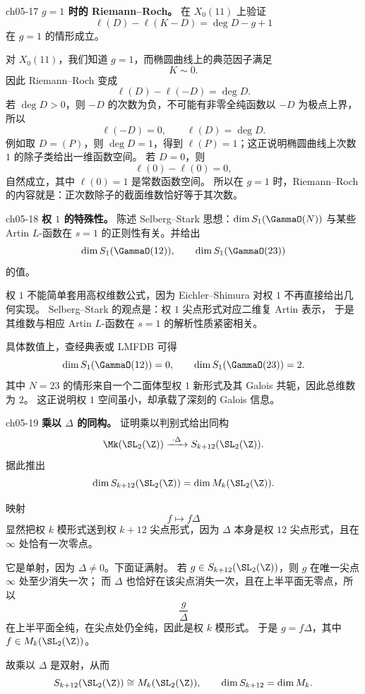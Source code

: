 \begin{problem}{ch05-17}
\textbf{$g=1$ 时的 Riemann--Roch。}
在 $X_0(11)$ 上验证
\[
\ell(D)-\ell(K-D)=\deg D-g+1
\]
在 $g=1$ 的情形成立。
\end{problem}
\begin{solution}
对 $X_0(11)$，我们知道 $g=1$，而椭圆曲线上的典范因子满足
\[
K\sim 0.
\]
因此 Riemann--Roch 变成
\[
\ell(D)-\ell(-D)=\deg D.
\]
若 $\deg D>0$，则 $-D$ 的次数为负，不可能有非零全纯函数以 $-D$ 为极点上界，所以
\[
\ell(-D)=0,
\qquad \ell(D)=\deg D.
\]
例如取 $D=(P)$，则 $\deg D=1$，得到 $\ell(P)=1$；这正说明椭圆曲线上次数 $1$ 的除子类给出一维函数空间。
若 $D=0$，则
\[
\ell(0)-\ell(0)=0,
\]
自然成立，其中 $\ell(0)=1$ 是常数函数空间。
所以在 $g=1$ 时，Riemann--Roch 的内容就是：正次数除子的截面维数恰好等于其次数。
\end{solution}

\begin{problem}{ch05-18}
\textbf{权 $1$ 的特殊性。}
陈述 Selberg--Stark 思想：$\dim S_1(\GammaO(N))$ 与某些 Artin $L$-函数在 $s=1$ 的正则性有关。并给出
\[
\dim S_1(\GammaO(12)),\qquad \dim S_1(\GammaO(23))
\]
的值。
\end{problem}
\begin{solution}
权 $1$ 不能简单套用高权维数公式，因为 Eichler--Shimura 对权 $1$ 不再直接给出几何实现。
Selberg--Stark 的观点是：权 $1$ 尖点形式对应二维复 Artin 表示，
于是其维数与相应 Artin $L$-函数在 $s=1$ 的解析性质紧密相关。

具体数值上，查经典表或 LMFDB 可得
\[
\dim S_1(\GammaO(12))=0,
\qquad
\dim S_1(\GammaO(23))=2.
\]
其中 $N=23$ 的情形来自一个二面体型权 $1$ 新形式及其 Galois 共轭，因此总维数为 $2$。
这正说明权 $1$ 空间虽小，却承载了深刻的 Galois 信息。
\end{solution}

\begin{problem}{ch05-19}
\textbf{乘以 $\Delta$ 的同构。}
证明乘以判别式给出同构
\[
\Mk(\SL_2(\Z))\xrightarrow{\ \cdot\Delta\ } S_{k+12}(\SL_2(\Z)).
\]
据此推出
\[
\dim S_{k+12}(\SL_2(\Z))=\dim M_k(\SL_2(\Z)).
\]
\end{problem}
\begin{solution}
映射
\[
f\longmapsto f\Delta
\]
显然把权 $k$ 模形式送到权 $k+12$ 尖点形式，因为 $\Delta$ 本身是权 $12$ 尖点形式，且在 $\infty$ 处恰有一次零点。

它是单射，因为 $\Delta\neq 0$。下面证满射。
若 $g\in S_{k+12}(\SL_2(\Z))$，则 $g$ 在唯一尖点 $\infty$ 处至少消失一次；
而 $\Delta$ 也恰好在该尖点消失一次，且在上半平面无零点，所以
\[
\frac{g}{\Delta}
\]
在上半平面全纯，在尖点处仍全纯，因此是权 $k$ 模形式。
于是 $g=f\Delta$，其中 $f\in M_k(\SL_2(\Z))$。

故乘以 $\Delta$ 是双射，从而
\[
S_{k+12}(\SL_2(\Z))\cong M_k(\SL_2(\Z)),
\qquad
\dim S_{k+12}=\dim M_k.
\]
\end{solution}

